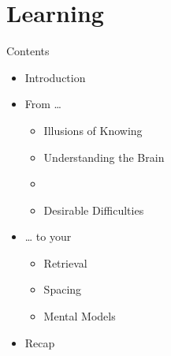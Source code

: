 \documentclass{ercisbeamer}
\begin{document}
\section{Learning}
\begin{frame}{Contents}
    \begin{itemize}
        \item Introduction
        \item From …
        \begin{itemize}
            \item Illusions of Knowing
            \item Understanding the Brain
            \item {}
            \item Desirable Difficulties
        \end{itemize}
        \item … to your 
        \begin{itemize}
            \item Retrieval
            \item Spacing
            \item Mental Models
        \end{itemize}
        \item Recap
    \end{itemize}
\end{frame}
\end{document}

